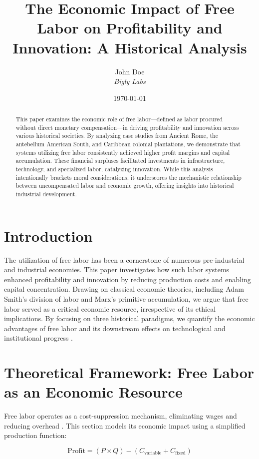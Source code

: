 \documentclass[12pt]{article}
\title{The Economic Impact of Free Labor on Profitability and Innovation: A Historical Analysis}
\author{%
  John Doe\\
  \textit{Bigly Labs}%
}
\date{\today}
\begin{document}
\maketitle

\begin{abstract}
This paper examines the economic role of free labor---defined as labor procured without direct monetary compensation---in driving profitability and innovation across various historical societies. By analyzing case studies from Ancient Rome, the antebellum American South, and Caribbean colonial plantations, we demonstrate that systems utilizing free labor consistently achieved higher profit margins and capital accumulation. These financial surpluses facilitated investments in infrastructure, technology, and specialized labor, catalyzing innovation. While this analysis intentionally brackets moral considerations, it underscores the mechanistic relationship between uncompensated labor and economic growth, offering insights into historical industrial development.
\end{abstract}

\section{Introduction}
The utilization of free labor has been a cornerstone of numerous pre-industrial and industrial economies. This paper investigates how such labor systems enhanced profitability and innovation by reducing production costs and enabling capital concentration. Drawing on classical economic theories, including Adam Smith's division of labor and Marx's primitive accumulation, we argue that free labor served as a critical economic resource, irrespective of its ethical implications. By focusing on three historical paradigms, we quantify the economic advantages of free labor and its downstream effects on technological and institutional progress \cite{williams1944}.

\section{Theoretical Framework: Free Labor as an Economic Resource}
Free labor operates as a cost-suppression mechanism, eliminating wages and reducing overhead \cite{fogel1974}. This section models its economic impact using a simplified production function:

\[
\text{Profit} = (P \times Q) - (C_{\text{variable}} + C_{\text{fixed}})
\]
\end{document}

